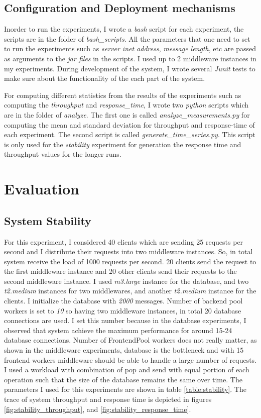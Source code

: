 \documentclass[11pt]{article}
\begin{document}
\subsection{Configuration and Deployment mechanisms}\label{sec:configuration-and-deployment-mechanisms}
Inorder to run the experiments, I wrote a \emph{bash} script for each experiment, 
the scripts are in the folder of \emph{bash\_scripts}. All the parameters that one need to set
to run the experiments such as \emph{server inet address}, \emph{message length}, etc 
are passed as arguments to the \emph{jar files} in the scripts. 
I used up to 2 middleware instances in my experiments.
During development of the system, I wrote several \emph{Junit} tests to make sure 
about the functionality of the each part of the system.

For computing different statistics from the results of the experiments such as 
computing the \emph{throughput} and \emph{response\_time}, I wrote 
two \emph{python} scripts which are in the folder of \emph{analyze}.
The first one is called \emph{analyze\_measurements.py}
for computing the mean and standard deviation for throughput and response-time of 
each experiment. The second script is called \emph{generate\_time\_series.py}. This 
script is only used for the \emph{stability} experiment for generation
the response time and throughput values for the longer runs.

\section{Evaluation}\label{sec:evaluation}

\subsection{System Stability}\label{sec:system-stability}
For this experiment, I considered 40 clients which are sending 25 requests 
per second and I distribute their requests into two middleware instances. 
So, in total system receive the load of 1000 requests per second. 20 clients 
send the request to the first middleware instance and 20 other clients send their 
requests to the second middleware instance.
I used \emph{m3.large} instance
for the database, and two \emph{t2.medium} instances for two middlewares, 
and another \emph{t2.medium} instance for the clients. I initialize the database 
with \emph{2000} messages. Number of backend pool workers is set to \emph{10} so having 
two middleware instances, in total 20 database connections are used. I set this number 
because in the database experiments, I observed that system achieve the maximum performance for 
around 15-24 database connections. Number of FrontendPool workers does not really 
matter, as shown in the middleware experiments, database is the bottleneck and 
with 15 frontend workers middleware should be able to handle a large number of 
requests. I used a workload with combination
of pop and send with equal portion of each operation such that the size of the database remains the same over time.
The parameters I used for this experiments 
are shown in table \ref{table:stability}. The trace of system throughput and response time is depicted in figures 
\ref{fig:stability_throughput}, and \ref{fig:stability_response_time}.
\end{document}

